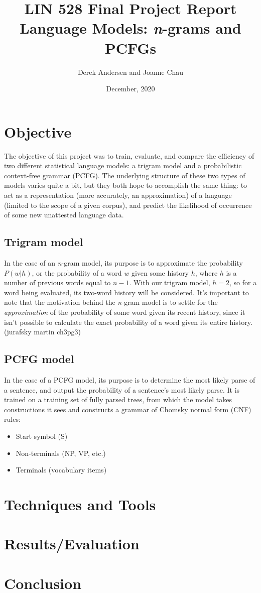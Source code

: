\documentclass{article}
\title{\textbf{LIN 528 Final Project Report}\\Language Models: \textit{n}-grams and PCFGs}
\author{Derek Andersen and Joanne Chau}
\date{December, 2020}
\begin{document}
\maketitle

\section{Objective}

The objective of this project was to train, evaluate, and compare the efficiency of two different statistical language models: a trigram model and a probabilistic context-free grammar (PCFG). The underlying structure of these two types of models varies quite a bit, but they both hope to accomplish the same thing: to act as a representation (more accurately, an approximation) of a language (limited to the scope of a given corpus), and predict the likelihood of occurrence of some new unattested language data.

\subsection{Trigram model}
In the case of an \textit{n}-gram model, its purpose is to approximate the probability $P(w|h)$, or the probability of a word $w$ given some history $h$, where $h$ is a number of previous words equal to $n-1$. With our trigram model, $h=2$, so for a word being evaluated, its two-word history will be considered. It's important to note that the motivation behind the \textit{n}-gram model is to settle for the \textit{approximation} of the probability of some word given its recent history, since it isn't possible to calculate the exact probability of a word given its entire history. (jurafsky martin ch3pg3) 

\subsection{PCFG model}
In the case of a PCFG model, its purpose is to determine the most likely parse of a sentence, and output the probability of a sentence's most likely parse. It is trained on a training set of fully parsed trees, from which the model takes constructions it sees and constructs a grammar of Chomsky normal form (CNF) rules:
\begin{itemize}
    \item Start symbol (S)
    \item Non-terminals (NP, VP, etc.)
    \item Terminals (vocabulary items)
\end{itemize}

 
\section{Techniques and Tools}


\section{Results/Evaluation}



\section{Conclusion}


\printbibliography{}
\end{document}
